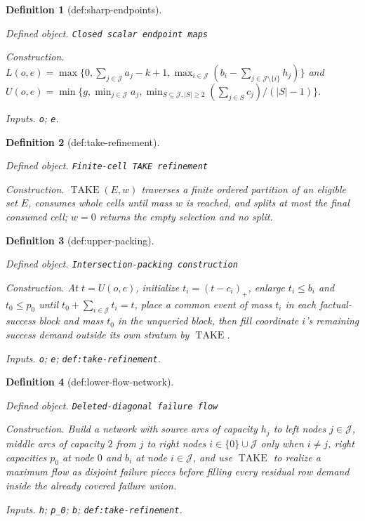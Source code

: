 \documentclass{article}
\newtheorem{definition}{Definition}
\begin{document}
\begin{definition}[def:sharp-endpoints]\label{def:sharp-endpoints}
\par\smallskip\noindent\emph{Defined object.} \texttt{Closed scalar endpoint maps}
\par\smallskip\noindent\emph{Construction.} \(L(o,e)=\max\{0,\sum_{j\in\mathcal J}a_j-k+1,\max_{i\in\mathcal J}(b_i-\sum_{j\in\mathcal J\setminus\{i\}}h_j)\}\) and \(U(o,e)=\min\{g,\min_{j\in\mathcal J}a_j,\min_{S\subseteq\mathcal J,|S|\geq2}(\sum_{j\in S}c_j)/(|S|-1)\}\).
\par\smallskip\noindent\emph{Inputs.} \texttt{o}; \texttt{e}.
\end{definition}

\begin{definition}[def:take-refinement]\label{def:take-refinement}
\par\smallskip\noindent\emph{Defined object.} \texttt{Finite-\allowbreak{}cell TAKE refinement}
\par\smallskip\noindent\emph{Construction.} \(\operatorname{TAKE}(E,w)\) traverses a finite ordered partition of an eligible set \(E\), consumes whole cells until mass \(w\) is reached, and splits at most the final consumed cell; \(w=0\) returns the empty selection and no split.
\end{definition}

\begin{definition}[def:upper-packing]\label{def:upper-packing}
\par\smallskip\noindent\emph{Defined object.} \texttt{Intersection-\allowbreak{}packing construction}
\par\smallskip\noindent\emph{Construction.} At \(t=U(o,e)\), initialize \(t_i=(t-c_i)_+\), enlarge \(t_i\leq b_i\) and \(t_0\leq p_0\) until \(t_0+\sum_{i\in\mathcal J}t_i=t\), place a common event of mass \(t_i\) in each factual-success block and mass \(t_0\) in the unqueried block, then fill coordinate \(i\)'s remaining success demand outside its own stratum by \(\operatorname{TAKE}\).
\par\smallskip\noindent\emph{Inputs.} \texttt{o}; \texttt{e}; \texttt{def:\allowbreak{}take-\allowbreak{}refinement}.
\end{definition}

\begin{definition}[def:lower-flow-network]\label{def:lower-flow-network}
\par\smallskip\noindent\emph{Defined object.} \texttt{Deleted-\allowbreak{}diagonal failure flow}
\par\smallskip\noindent\emph{Construction.} Build a network with source arcs of capacity \(h_j\) to left nodes \(j\in\mathcal J\), middle arcs of capacity \(2\) from \(j\) to right nodes \(i\in\{0\}\cup\mathcal J\) only when \(i\neq j\), right capacities \(p_0\) at node \(0\) and \(b_i\) at node \(i\in\mathcal J\), and use \(\operatorname{TAKE}\) to realize a maximum flow as disjoint failure pieces before filling every residual row demand inside the already covered failure union.
\par\smallskip\noindent\emph{Inputs.} \texttt{h}; \texttt{p\_\allowbreak{}0}; \texttt{b}; \texttt{def:\allowbreak{}take-\allowbreak{}refinement}.
\end{definition}
\end{document}
